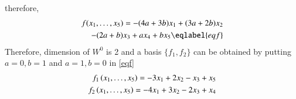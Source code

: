 \documentclass[journal,12pt,twocolumn]{IEEEtran}
\begin{document}
therefore,
\begin{multline}
\begin{aligned}
f(x_1,\dots,x_5)=-(4a+3b)x_1+(3a+2b)x_2\\
-(2a+b)x_3+ax_4+bx_5 \eqlabel{eqf}
\end{aligned}
\end{multline}
Therefore, dimension of $W^0$ is 2 and a basis $\{f_1,f_2\}$ can be obtained by putting $a=0,b=1$ and $a=1,b=0$ in \eqref{eqf}
\begin{align}
    f_1\left(x_1,\dots,x_5\right)=-3x_1+2x_2-x_3+x_5\\
    f_2\left(x_1,\dots,x_5\right)=-4x_1+3x_2-2x_3+x_4
\end{align}
\end{document}
